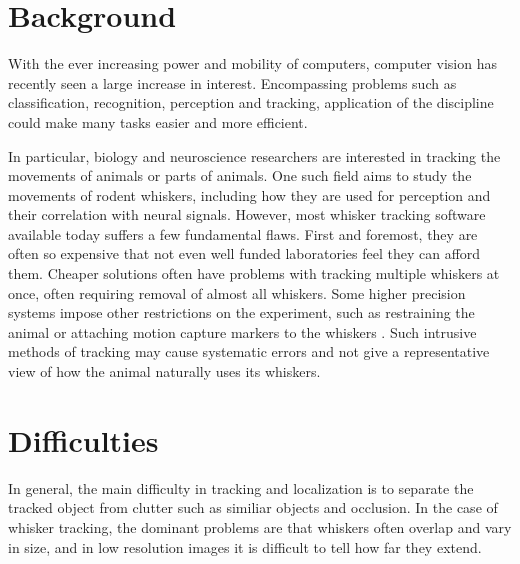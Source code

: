 \section{Background}





With the ever increasing power and mobility of computers, computer vision has recently seen a large increase in interest. Encompassing problems such as classification, recognition, perception and tracking, application of the discipline could make many tasks easier and more efficient.

In particular, biology and neuroscience researchers are interested in tracking the movements of animals or parts of animals. One such field aims to study the movements of rodent whiskers, including how they are used for perception and their correlation with neural signals. However, most whisker tracking software available today suffers a few fundamental flaws. First and foremost, they are often so expensive that not even well funded laboratories feel they can afford them. Cheaper solutions often have problems with tracking multiple whiskers at once, often requiring removal of almost all whiskers. Some higher precision systems impose other restrictions on the experiment, such as restraining the animal or attaching motion capture markers to the whiskers \cite{BadExample1}. Such intrusive methods of tracking may cause systematic errors and not give a representative view of how the animal naturally uses its whiskers.

\section{Difficulties}
In general, the main difficulty in tracking and localization is to separate the tracked object from clutter such as similiar objects and occlusion. In the case of whisker tracking, the dominant problems are that whiskers often overlap and vary in size, and in low resolution images it is difficult to tell how far they extend.

